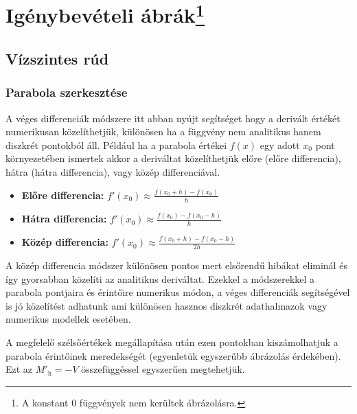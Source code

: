 \section[\texorpdfstring{Igénybevételi ábrák}{Igénybevételi ábrák}]%
{Igénybevételi ábrák\protect\footnote{A konstant 0 függvények nem kerültek ábrázolásra.}}

\pgfmathsetmacro{\framewidth}{.7mm}

\subsection{Vízszintes rúd}

\subsubsection{Parabola szerkesztése}


A véges differenciák módszere itt abban nyújt segítséget hogy a derivált értékét numerikusan közelíthetjük, különösen ha a függvény nem analitikus hanem diszkrét pontokból áll. Például ha a parabola értékei $f(x)$ egy adott $x_0$ pont környezetében ismertek akkor a deriváltat közelíthetjük előre (előre differencia), hátra (hátra differencia), vagy közép differenciával.

\vskip 20pt

\begin{itemize}
	\item \textbf{Előre differencia:}
		$f'(x_0) \approx \frac{f(x_0 + h) - f(x_0)}{h}$

	\item \textbf{Hátra differencia:}
		$f'(x_0) \approx \frac{f(x_0) - f(x_0 - h)}{h}$

	\item \textbf{Közép differencia:}
		$f'(x_0) \approx \frac{f(x_0 + h) - f(x_0 - h)}{2h}$
\end{itemize}

\vskip 20pt

A közép differencia módszer különösen pontos mert elsőrendű hibákat eliminál és így gyorsabban közelíti az analitikus deriváltat. Ezekkel a módszerekkel a parabola pontjaira és érintőire numerikus módon, a véges differenciák segítségével is jó közelítést adhatunk ami különösen hasznos diszkrét adathalmazok vagy numerikus modellek esetében.

A megfelelő szélsőértékek megállapítása után ezen pontokban kiszámolhatjuk a parabola érintőinek meredekségét (egyenletük egyszerűbb ábrázolás érdekében). Ezt az ${M'}_\text{h} = -V$ összefüggéssel egyszerűen megtehetjük.


